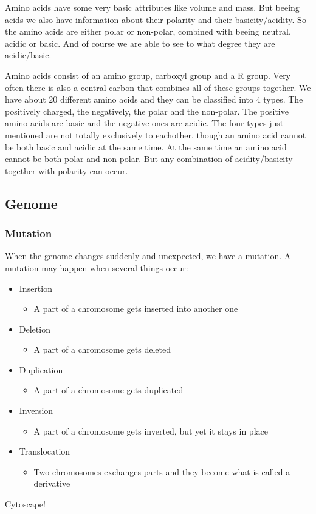 \documentclass[UKenglish,11pt,twoside,a4paper]{report}
\begin{document}
Amino acids have some very basic attributes like volume and mass. But beeing acids we also have information about their
polarity and their basicity/acidity. So the amino acids are either polar or non-polar, combined with beeing neutral,
acidic or basic. And of course we are able to see to what degree they are acidic/basic.

Amino acids consist of an amino group, carboxyl group and a R group. Very often there is also a central carbon that
combines all of these groups together. We have about 20 different amino acids and they can be classified into 4 types.
The positively charged, the negatively, the polar and the non-polar. The positive amino acids are basic and the negative
ones are acidic. The four types just mentioned are not totally exclusively to eachother, though an amino acid cannot be
both basic and acidic at the same time. At the same time an amino acid cannot be both polar and non-polar. But any
combination of acidity/basicity together with polarity can occur.
\subsection*{Genome}
\subsubsection*{Mutation}
When the genome changes suddenly and unexpected, we have a mutation. A mutation may happen when several things occur:
\begin{itemize}
    \item Insertion
        \begin{itemize}
            \item A part of a chromosome gets inserted into another one
        \end{itemize}
    \item Deletion
        \begin{itemize}
            \item A part of a chromosome gets deleted
        \end{itemize}
    \item Duplication
        \begin{itemize}
            \item A part of a chromosome gets duplicated
        \end{itemize}
    \item Inversion
        \begin{itemize}
            \item A part of a chromosome gets inverted, but yet it stays in place
        \end{itemize}
    \item Translocation
        \begin{itemize}
            \item Two chromosomes exchanges parts and they become what is called a derivative
        \end{itemize}
\end{itemize}
Cytoscape!\cite{tester}
\printbibliography
\end{document}
